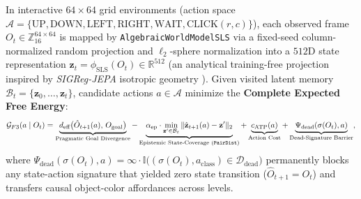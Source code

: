 \documentclass[10pt,a4paper]{article}
\begin{document}
In interactive $64\times 64$ grid environments (action space $\mathcal{A} = \{\text{UP}, \text{DOWN}, \text{LEFT}, \text{RIGHT}, \text{WAIT}, \text{CLICK}(r,c)\}$), each observed frame $O_t \in \mathbb{Z}_{16}^{64\times 64}$ is mapped by \texttt{AlgebraicWorldModelSLS} via a fixed-seed column-normalized random projection and $\ell_2$-sphere normalization into a $512\text{D}$ state representation $\mathbf{z}_t = \phi_{\text{SLS}}(O_t) \in \mathbb{R}^{512}$ (an analytical training-free projection inspired by \emph{SIGReg-JEPA} isotropic geometry \cite{balestriero2025lejepa,arnez2026sigreg}). Given visited latent memory $\mathcal{B}_t = \{\mathbf{z}_0, \dots, \mathbf{z}_t\}$, candidate actions $a \in \mathcal{A}$ minimize the \textbf{Complete Expected Free Energy}:
\begin{equation}
\label{eq:efe_gf3}
\mathcal{G}_{F3}(a \mid O_t) = \underbrace{d_{\text{eff}}\big(\hat{O}_{t+1}(a),\, O_{\text{goal}}\big)}_{\text{Pragmatic Goal Divergence}} - \underbrace{\alpha_{\text{ep}} \cdot \min_{\mathbf{z}' \in \mathcal{B}_t} \|\hat{\mathbf{z}}_{t+1}(a) - \mathbf{z}'\|_2}_{\text{Epistemic State-Coverage (\texttt{PairDist})}} + \underbrace{c_{\text{ATP}}(a)}_{\text{Action Cost}} + \underbrace{\Psi_{\text{dead}}(\sigma(O_t), a)}_{\text{Dead-Signature Barrier}},
\end{equation}
where $\Psi_{\text{dead}}(\sigma(O_t), a) = \infty \cdot \mathbb{I}\big((\sigma(O_t), a_{\text{class}}) \in \mathcal{D}_{\text{dead}}\big)$ permanently blocks any state-action signature that yielded zero state transition ($\hat{O}_{t+1} = O_t$) and transfers causal object-color affordances across levels.
\end{document}
